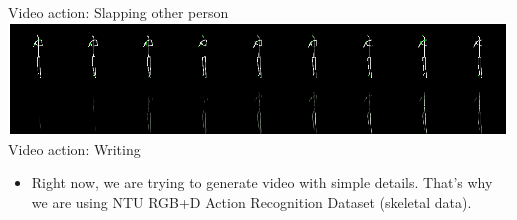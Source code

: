 \documentclass[landscape,a0paper,fontscale=0.285]{baposter} %
\newcommand{\compresslist}{ %
\setlength{\itemsep}{1pt}
\setlength{\parskip}{0pt}
\setlength{\parsep}{0pt}
}
\begin{document}
\begin{poster}
{\begin{center}
\begin{multicols}{2}
{	\\Video action: Slapping other person\\}
	{\includegraphics[scale=0.55]{writing}
	\\Video action: Writing}
\end{multicols}
\end{center}

\vspace*{-2.1em}
\begin{itemize}\compresslist
\item Right now, we are trying to generate video with simple details. That's why we are using NTU RGB+D Action Recognition Dataset (skeletal data).
\end{itemize}

}
\end{poster}
\end{document}
